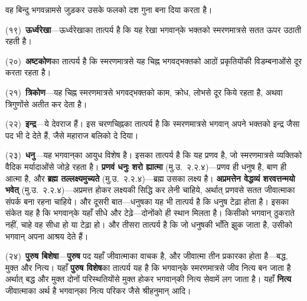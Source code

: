 \begin{sloppypar}\justifying{}
वह बिन्दु भगवन्नामसे जुड़कर उसके फलको दश गुना बना दिया करता है।
\end{sloppypar}
\begin{sloppypar}\justifying{}
(१९)~\textbf{ऊर्ध्वरेखा}—ऊर्ध्वरेखाका तात्पर्य है कि यह रेखा भगवान्‌के भक्तको स्मरण\-मात्रसे सतत ऊपर उठाती रहती है।
\end{sloppypar}
\begin{sloppypar}\justifying{}
(२०)~\textbf{अष्टकोण}का तात्पर्य है कि स्मरण\-मात्रसे यह चिह्न भगवद्भक्तको आठों प्रकृतियोंकी विडम्बनाओंसे दूर करता रहता है।
\end{sloppypar}
\begin{sloppypar}\justifying{}
(२१)~\textbf{त्रिकोण}—यह चिह्न स्मरण\-मात्रसे भगवद्भक्तको काम, क्रोध, लोभसे दूर किये रहता है, अथवा त्रिगुणोंसे अतीत कर देता है।
\end{sloppypar}
\begin{sloppypar}\justifying{}
(२२)~\textbf{इन्द्र}—ये देवराज हैं। इस चरणचिह्नका तात्पर्य है कि स्मरण\-मात्रसे भगवान् अपने भक्तको इन्द्र जैसा पद भी दे देते हैं, जैसे महाराज बलिको दे दिया।
\end{sloppypar}
\begin{sloppypar}\justifying{}
(२३)~\textbf{धनु}—यह भगवान्‌का आयुध विशेष है। इसका तात्पर्य है कि यह प्रणव है, जो स्मरण\-मात्रसे व्यक्तिको वैदिक मर्यादाओंसे जोड़े रहता है। \textbf{प्रणवं धनुः शरो ह्यात्मा} (मु.उ.~२.२.४)—प्रणव ही धनुष है, बाण ही आत्मा है, और \textbf{ब्रह्म तल्लक्ष्यमुच्यते} (मु.उ.~२.२.४)—ब्रह्म उसका लक्ष्य है। \textbf{अप्रमत्तेन वेद्धव्यं शरवत्तन्मयो भवेत्} (मु.उ.~२.२.४)—अप्रमत्त होकर लक्ष्यकी सिद्धि कर लेनी चाहिये, अर्थात् प्रणवसे सतत जीवात्माका संपर्क बना रहना चाहिये। और दूसरी बात—धनुषका यह भी तात्पर्य है कि धनुष टेढ़ा होता है। इसका संकेत यह है कि भगवान्‌के यहाँ सीधे और टेढ़े—दोनोंको ही स्थान मिलता है। किसीको भगवान् ठुकराते नहीं, चाहे वह सीधा हो या टेढ़ा हो। और तीसरा तात्पर्य है कि जो धनुषकी भाँति झुक जाता है, उसीको भगवान् अपना आश्रय देते हैं।
\end{sloppypar}
\begin{sloppypar}\justifying{}
(२४)~\textbf{पुरुष बिशेषा}—\textbf{पुरुष} पद यहाँ जीवात्माका वाचक है, और जीवात्मा तीन प्रकारका होता है—बद्ध, मुक्त और नित्य। यहाँ \textbf{पुरुष विशेष}का तात्पर्य यह है कि भगवान्‌के स्मरण\-मात्रसे जीव नित्य बन जाता है अर्थात् बद्ध और मुक्त दोनों परिस्थतियोंसे मुक्त होकर भगवान्‌की नित्य सेवामें लग जाता है। यहाँ \textbf{नित्य} जीवात्माका अर्थ है भगवान्‌का नित्य परिकर जैसे श्रीहनुमान् आदि।
\end{sloppypar}
